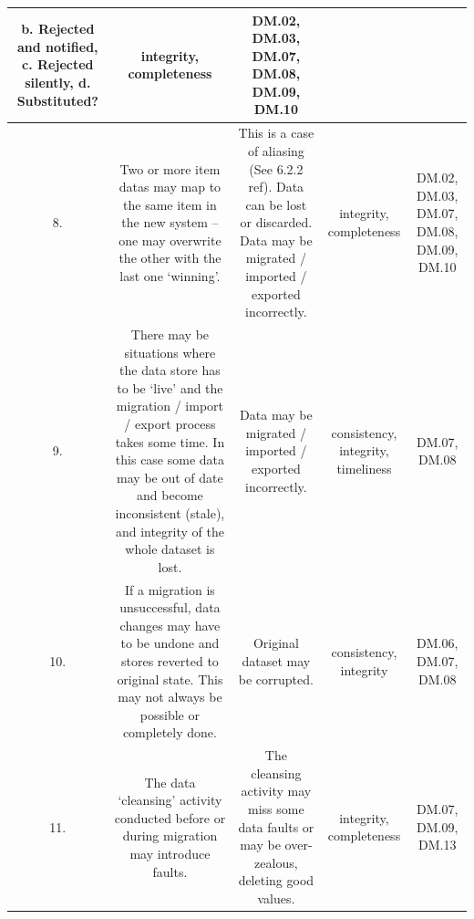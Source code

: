 \begin{longtable}{|C{}|C{}|C{}|C{}|C{}|}
b. Rejected and notified, c. Rejected silently, d. Substituted?&
\Gls{integrity}, \gls{completeness}&
DM.02, DM.03, DM.07, DM.08, DM.09, DM.10\\\hline
%
8.&
Two or more \glspl{item data} may map to the same item in the new system – one may overwrite the other with the last one ‘winning’.&
This is a case of aliasing (See 6.2.2 ref). Data can be lost or discarded. Data may be migrated / imported / exported incorrectly.&
\Gls{integrity}, \gls{completeness}&
DM.02, DM.03, DM.07, DM.08, DM.09, DM.10\\\hline
%
9.&
There may be situations where the data store has to be ‘live’ and the migration / import / export process takes some time.
In this case some data may be out of date and become inconsistent (stale), and \gls{integrity} of the whole \gls{dataset} is lost.&
Data may be migrated / imported / exported incorrectly.&
\Gls{consistency}, \gls{integrity}, \gls{timeliness}&
DM.07, DM.08\\\hline
%
10.&
If a migration is unsuccessful, data changes may have to be undone and stores reverted to original state.
This may not always be possible or completely done.&
Original \gls{dataset} may be corrupted.&
\Gls{consistency}, \Gls{integrity}&
DM.06, DM.07, DM.08\\\hline
%
11.&
The data ‘cleansing’ activity conducted before or during migration may introduce faults.&
The cleansing activity may miss some data faults or may be over-zealous, deleting good values.&
\Gls{integrity}, \gls{completeness}&
DM.07, DM.09, DM.13\\\hline
\end{longtable}
